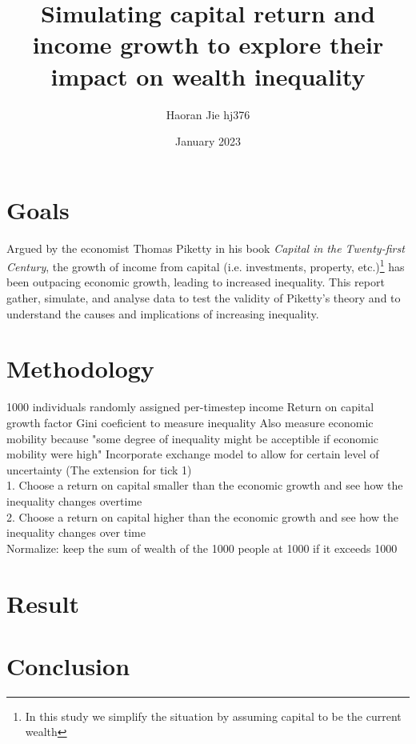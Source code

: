 \documentclass{article}
\title{Simulating capital return and income growth to explore their impact on wealth inequality
}
\author{Haoran Jie hj376}
\date{January 2023}
\begin{document}
\maketitle


\section*{Goals}
Argued by the economist Thomas Piketty in his book \textit{Capital in the Twenty-first Century}, the growth of income from capital (i.e. investments, property, etc.)\footnote{In this study we simplify the situation by assuming capital to be the current wealth} has been outpacing economic growth, leading to increased inequality. This report gather, simulate, and analyse data to test the validity of Piketty's theory and to understand the causes and implications of increasing inequality.

\section*{Methodology}
1000 individuals randomly assigned per-timestep income
Return on capital growth factor
Gini coeficient to measure inequality
Also measure economic mobility because "some degree of inequality might be acceptible if economic mobility were high"
Incorporate exchange model to allow for certain level of uncertainty (The extension for tick 1)\\
1. Choose a return on capital smaller than the economic growth and see how the inequality changes overtime\\
2. Choose a return on capital higher than the economic growth and see how the inequality changes over time\\
Normalize: keep the sum of wealth of the 1000 people at 1000 if it exceeds 1000
\section*{Result}


\section*{Conclusion}
\end{document}
